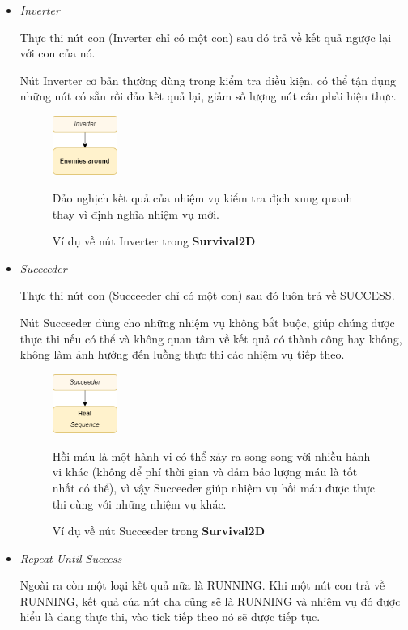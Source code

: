 \documentclass[12pt,a4paper]{article}
\begin{document}
\begin{itemize}
      \item \textit{Inverter}
      
      Thực thi nút con (Inverter chỉ có một con) sau đó trả về kết quả ngược lại với con của nó.
      
      Nút Inverter cơ bản thường dùng trong kiểm tra điều kiện, có thể tận dụng những nút có sẵn rồi đảo kết quả lại, giảm số lượng nút cần phải hiện thực.
      \begin{figure}[H]
          \centering
          \includegraphics[width=0.2\textwidth]{Img/AI/inverter.png}
          \caption{Ví dụ về nút Inverter trong \textbf{Survival2D}}
          Đảo nghịch kết quả của nhiệm vụ kiểm tra địch xung quanh thay vì định nghĩa nhiệm vụ mới.
      \end{figure}
      \item \textit{Succeeder}
      
      Thực thi nút con (Succeeder chỉ có một con) sau đó luôn trả về SUCCESS.
      
      Nút Succeeder dùng cho những nhiệm vụ không bắt buộc, giúp chúng được thực thi nếu có thể và không quan tâm về kết quả có thành công hay không, không làm ảnh hưởng đến luồng thực thi các nhiệm vụ tiếp theo.
      \begin{figure}[H]
          \centering
          \includegraphics[width=0.2\textwidth]{Img/AI/succeeder.png}
          \caption{Ví dụ về nút Succeeder trong \textbf{Survival2D}}
          Hồi máu là một hành vi có thể xảy ra song song với nhiều hành vi khác (không để phí thời gian và đảm bảo lượng máu là tốt nhất có thể), vì vậy Succeeder giúp nhiệm vụ hồi máu được thực thi cùng với những nhiệm vụ khác.
      \end{figure}
      \item \textit{Repeat Until Success}
      
      Ngoài ra còn một loại kết quả nữa là RUNNING. Khi một nút con trả về RUNNING, kết quả của nút cha cũng sẽ là RUNNING và nhiệm vụ đó được hiểu là đang thực thi, vào tick tiếp theo nó sẽ được tiếp tục.
      

\end{itemize}
\end{document}
